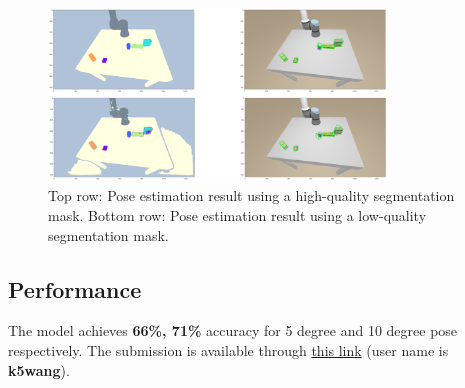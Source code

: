 \documentclass{article}
\begin{document}
    \begin{figure}[H]\centering
        \includegraphics[width=0.8\textwidth]{ablation3.png}
        \caption{Top row: Pose estimation result using a high-quality segmentation mask.
        Bottom row: Pose estimation result using a low-quality segmentation mask.\label{fig:ablation3}}
    \end{figure}
    

\subsection{Performance}    %


The model achieves \textbf{66\%, 71\%} accuracy for 5 degree and 10 degree pose respectively. The submission is available 
through \href{https://storage1.ucsd.edu/cse291ibenchmark/benchmark3}{this link} (user name is \textbf{k5wang}).


\printbibliography
\end{document}
